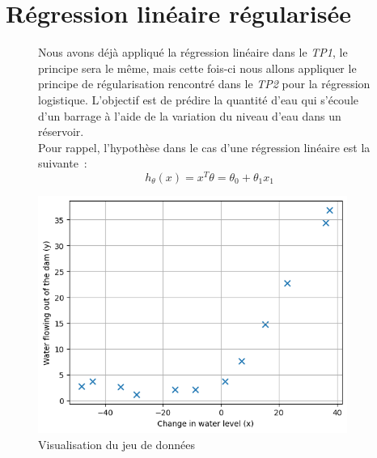 \section{Régression linéaire régularisée}

\begin{figure}[!h]
    \begin{minipage}{.48\linewidth}
        Nous avons déjà appliqué la régression linéaire dans le \textit{TP1}, le principe sera le même, mais cette fois-ci nous 
        allons appliquer le principe de régularisation rencontré dans le \textit{TP2} pour la régression logistique. L'objectif 
        est de prédire la quantité d'eau qui s'écoule d'un barrage à l'aide de la variation du niveau d'eau dans un réservoir.\\

        Pour rappel, l'hypothèse dans le cas d'une régression linéaire est la suivante~:
        \begin{equation}\label{eq:regression_linear}
            h_\theta(x) = x^T \theta =\theta_0 + \theta_1 x_1
        \end{equation}

    \end{minipage}\hfill
    \begin{minipage}{.48\linewidth}
        \begin{center}
            \includegraphics[width=0.9\textwidth]{./img/3.1.png}
            \caption{\label{fig:data-plot}Visualisation du jeu de données}  
        \end{center}
    \end{minipage}
\end{figure}


